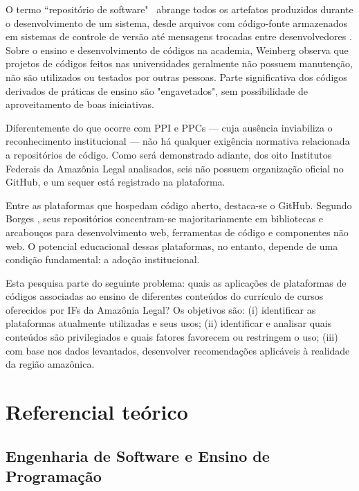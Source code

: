 \documentclass[english, spanish, brazilian]{RBIEarticle}
\begin{document}
O termo ``repositório de software" ~abrange todos os artefatos produzidos durante o desenvolvimento de um sistema, desde arquivos com código-fonte armazenados em sistemas de controle de versão até mensagens trocadas entre desenvolvedores \cite{sokol2013}. Sobre o ensino e desenvolvimento de códigos na academia, Weinberg \cite{barr2018} observa que projetos de códigos feitos nas universidades geralmente não possuem manutenção, não são utilizados ou testados por outras pessoas. Parte significativa dos códigos derivados de práticas de ensino são "engavetados", sem possibilidade de aproveitamento de boas iniciativas.

Diferentemente do que ocorre com PPI e PPCs — cuja ausência inviabiliza o reconhecimento institucional — não há qualquer exigência normativa relacionada a repositórios de código. Como será demonstrado adiante, dos oito Institutos Federais da Amazônia Legal analisados, seis não possuem organização oficial no GitHub, e um sequer está registrado na plataforma.

Entre as plataformas que hospedam código aberto, destaca-se o GitHub. Segundo Borges \cite{borges2016}, seus repositórios concentram-se majoritariamente em bibliotecas e arcabouços para desenvolvimento web, ferramentas de código e componentes não web. O potencial educacional dessas plataformas, no entanto, depende de uma condição fundamental: a adoção institucional.


Esta pesquisa parte do seguinte problema: quais as aplicações de plataformas de códigos associadas ao ensino de diferentes conteúdos do currículo de cursos oferecidos por IFs da Amazônia Legal? Os objetivos são: (i) identificar as plataformas atualmente utilizadas e seus usos; (ii) identificar e analisar quais conteúdos são privilegiados e quais fatores favorecem ou restringem o uso; (iii) com base nos dados levantados, desenvolver recomendações aplicáveis à realidade da região amazônica.

\section{Referencial teórico}

\subsection{Engenharia de Software e Ensino de Programação}
\end{document}
